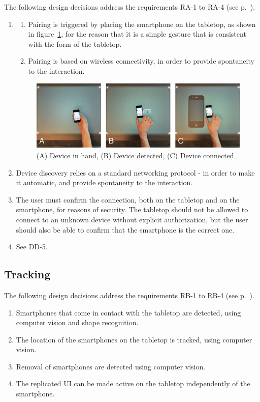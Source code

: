 The following design decisions address the requirements RA-1 to RA-4 (see p.~\pageref{RA}).

\begin{enumerate}[{DA}-1]
\item \hfill
	\begin{enumerate}[{DA-1}a]
	\item Pairing is triggered by placing the smartphone on the tabletop, as shown in figure~\ref{fig:sqPair}, for the reason that it is a simple gesture that is consistent with the form of the tabletop.
	\item Pairing is based on wireless connectivity, in order to provide spontaneity to the interaction.
	\end{enumerate}
	
\begin{figure}[htb]
  \centering
    \includegraphics[width=0.7\linewidth]{images/sqPair}
  \caption{(A) Device in hand, (B) Device detected, (C) Device connected}
  \label{fig:sqPair}
\end{figure}

\item Device discovery relies on a standard networking protocol - in order to make it automatic, and provide spontaneity to the interaction.
\item The user must confirm the connection, both on the tabletop and on the smartphone, for reasons of security.
The tabletop should not be allowed to connect to an unknown device without explicit authorization, but the user should also be able to confirm that the smartphone is the correct one.
\item See DD-5.
\end{enumerate}

\subsection{Tracking}

The following design decisions address the requirements RB-1 to RB-4 (see p.~\pageref{RB}).

\label{DB}
\begin{enumerate}[{DB}-1]
\item Smartphones that come in contact with the tabletop are detected, using computer vision and shape recognition.
\item The location of the smartphones on the tabletop is tracked, using computer vision.
\item Removal of smartphones are detected using computer vision.
\item The replicated UI can be made active on the tabletop independently of the smartphone.
\end{enumerate}

